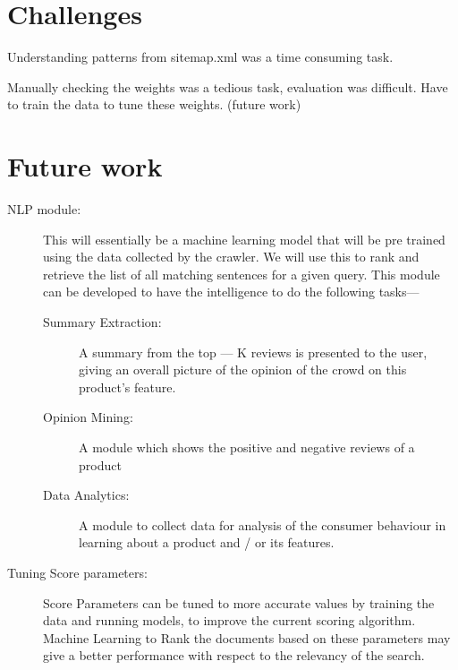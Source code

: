 \documentclass{article}
\begin{document}
\section{Challenges}
\begin{description}
  \item Understanding patterns from sitemap.xml was a time consuming task.
  \item Manually checking the weights was a tedious task, evaluation was difficult.  Have to train the data to tune these weights. (future work)
\end{description}

\section{Future work}
\begin{description}
  \item[NLP module:] This will essentially be a machine learning model that will be pre trained using the data collected by the crawler. We will use this to rank and retrieve the list of all matching sentences for a given query. This module can be developed to have the intelligence to do the following tasks---
	\begin{description}
		\item[Summary Extraction: ] A summary from the top --- K reviews is presented to the user, giving an overall picture of the opinion of the crowd on this product's feature. 
		\item[Opinion Mining:] A module which shows the positive and negative reviews of a product
		\item[Data Analytics:] A module to collect data for analysis of the consumer behaviour in learning about a product and / or its features.
	\end{description}
 \item[Tuning Score parameters: ] Score Parameters can be tuned to more accurate values by training the data and running models, to improve the current scoring algorithm. Machine Learning to Rank the documents based on these parameters  may give a better performance with respect to the relevancy of the search.

\end{description}
\end{document}
